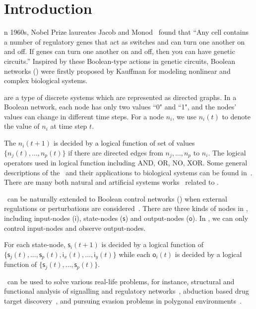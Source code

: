 \section{Introduction}
\label{sec:intro}


n 1960s, Nobel Prize laureates Jacob and Monod~\cite{Jacob1961Genetic} found that ``Any cell contains a number of regulatory genes that act as switches and can turn one another on and off. If genes can turn one another on and off, then you can have genetic circuits.'' Inspired by these Boolean-type actions in genetic circuits, Boolean networks (\BNs) were firstly proposed by Kauffman \cite{Kauffman1968Metabolic} for modeling nonlinear and complex biological systems. 

{\BNs} are a type of discrete systems which are represented as directed graphs. In a Boolean network, each node has only two values ``0" and ``1", and
the nodes' values can change in different time steps.  For a node $n_i$, we use $n_i(t)$ to denote the value of $n_i$ at time step $t$.

The $n_i(t+1)$ is decided by a logical function of  set of  values  $\{n_j(t),\ldots,n_p(t)\}$ if  there are directed edges from $n_j,\ldots,n_p$ to $n_i$.  
 The logical operators used in  logical function including AND, OR, NO, XOR. 
Some general descriptions of the \BNs\ and their applications to biological systems can be found in~\cite{Kauffman1968Metabolic}.
There are many both natural and artificial systems works~\cite{Akutsu2000Inferring, Shmulevich2002From, Faur2006Dynamical,Green2007The,Lou2010Multi} related to \BNs.
 

\BNs\ can be naturally extended to Boolean control networks (\BCNs) when external regulations or perturbations are considered~\cite{Ideker2001A}. There are three kinds of nodes in \BCNs, including input-nodes ($\mathsf{i}$), state-nodes ($\mathsf{s}$) and output-nodes ($\mathsf{o}$). In \BCNs, we can only control input-nodes and observe output-nodes. 

For each state-node, $\mathsf{s}_i(t+1)$ is decided by a logical function of  $\{\mathsf{s}_j(t),\ldots,\mathsf{s}_p(t),\mathsf{i}_x(t),\ldots,\mathsf{i}_y(t)\}$  %
while each $\mathsf{o}_i(t)$ is decided by a logical function of   $\{\mathsf{s}_j(t),\ldots,\mathsf{s}_p(t)\}$. 

\BCNs\ can be used to solve various real-life problems, for instance, 
structural and functional analysis of signalling and regulatory networks~\cite{Kaufman1999A, Klamt2006A}, 
abduction based drug target discovery~\cite{Biane2017Abduction}, 
and pursuing evasion problems in polygonal environments~\cite{Thunberg2011A}. 

